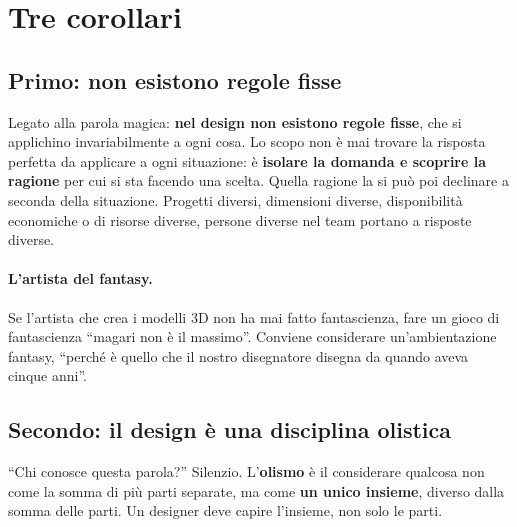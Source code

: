\section{Tre corollari}
\label{gd8:sec:corollari}



\subsection{Primo: non esistono regole fisse}

Legato alla parola magica: \textbf{nel design non esistono regole fisse}, che
si applichino invariabilmente a ogni cosa. Lo scopo non è mai trovare la
risposta perfetta da applicare a ogni situazione: è \textbf{isolare la domanda
e scoprire la ragione} per cui si sta facendo una scelta. Quella ragione la si
può poi declinare a seconda della situazione. Progetti diversi, dimensioni
diverse, disponibilità economiche o di risorse diverse, persone diverse nel
team portano a risposte diverse.

\paragraph{L'artista del fantasy.} Se l'artista che crea i modelli 3D non ha
mai fatto fantascienza, fare un gioco di fantascienza ``magari non è il
massimo''. Conviene considerare un'ambientazione fantasy, ``perché è quello che
il nostro disegnatore disegna da quando aveva cinque anni''.

\subsection{Secondo: il design è una disciplina olistica}

``Chi conosce questa parola?'' Silenzio. L'\textbf{olismo} è il considerare
qualcosa non come la somma di più parti separate, ma come \textbf{un unico
insieme}, diverso dalla somma delle parti. Un designer deve capire l'insieme,
non solo le parti.

